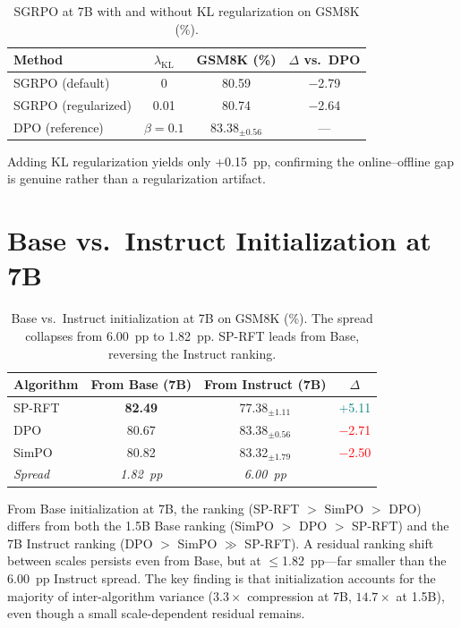 \documentclass{article}
\newcommand{\sprft}{SP-RFT}
\begin{document}
\begin{table}[ht]
\centering
\caption{SGRPO at 7B with and without KL regularization on GSM8K (\%).}
\label{tab:kl_ablation}
\small
\begin{tabular}{@{}lccc@{}}
\toprule
\textbf{Method} & $\lambda_{\text{KL}}$ & \textbf{GSM8K (\%)} & \textbf{$\Delta$ vs.\ DPO} \\
\midrule
SGRPO (default) & 0 & 80.59 & $-$2.79 \\
SGRPO (regularized) & 0.01 & 80.74 & $-$2.64 \\
\midrule
DPO (reference) & $\beta = 0.1$ & 83.38$_{\pm 0.56}$ & --- \\
\bottomrule
\end{tabular}
\end{table}

Adding KL regularization yields only +0.15~pp, confirming the online--offline gap is genuine rather than a regularization artifact.

\section{Base vs.\ Instruct Initialization at 7B}
\label{app:base_7b_ablation}

\begin{table}[ht]
\centering
\caption{Base vs.\ Instruct initialization at 7B on GSM8K (\%). The spread collapses from 6.00~pp to 1.82~pp. \sprft{} leads from Base, reversing the Instruct ranking.}
\label{tab:base_7b_ablation}
\small
\begin{tabular}{@{}lccc@{}}
\toprule
\textbf{Algorithm} & \textbf{From Base (7B)} & \textbf{From Instruct (7B)} & \textbf{$\Delta$} \\
\midrule
\sprft{} & \textbf{82.49} & 77.38$_{\pm 1.11}$ & \textcolor{teal}{+5.11} \\
DPO & 80.67 & 83.38$_{\pm 0.56}$ & \textcolor{red}{$-$2.71} \\
SimPO & 80.82 & 83.32$_{\pm 1.79}$ & \textcolor{red}{$-$2.50} \\
\midrule
\textit{Spread} & \textit{1.82~pp} & \textit{6.00~pp} & \\
\bottomrule
\end{tabular}
\end{table}

From Base initialization at 7B, the ranking (\sprft{} $>$ SimPO $>$ DPO) differs from both the 1.5B Base ranking (SimPO $>$ DPO $>$ \sprft{}) and the 7B Instruct ranking (DPO $>$ SimPO $\gg$ \sprft{}). A residual ranking shift between scales persists even from Base, but at $\leq$1.82~pp---far smaller than the 6.00~pp Instruct spread. The key finding is that initialization accounts for the majority of inter-algorithm variance ($3.3\times$ compression at 7B, $14.7\times$ at 1.5B), even though a small scale-dependent residual remains.
\end{document}
